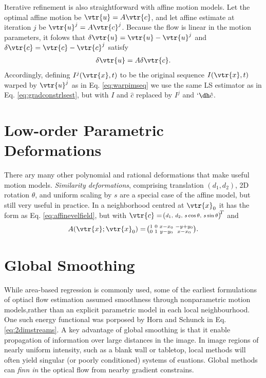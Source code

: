 \begin{compactdesc}
	Iterative refinement is also straightforward with affine motion models. Let the optimal affine motion be $\vtr{u}=A\vtr{c}$, and let affine estimate at iteration $j$ be $\vtr{u}^j=A\vtr{c}^{j}$. Because the flow is linear in the motion parameters, it folows that $\delta\vtr{u}=\vtr{u}-\vtr{u}^j$ and $\delta\vtr{c}=\vtr{c}-\vtr{c}^j$ satisfy
	\begin{gather*}
		\delta\vtr{u}=A\delta\vtr{c}.
	\end{gather*}
	Accordingly, defining $I^j(\vtr{x},t)$ to be the original sequence $I(\vtr{x},t)$ warped by $\vtr{u}^j$ as in Eq.  \ref{eq:warpimseq} we use the same LS estimator as in Eq. \ref{eq:gradconstrlsest}, but with $I$ and $\hat{c}$ replaced by $I^j$ and $`ð \hat{c}$.
	\section{Low-order Parametric Deformations}
	There ary many other polynomial and rational deformations that make useful motion models. \emph{Similarity deformations}, comprising translation $(d_1,d_2)$, 2D rotation $\theta$, and uniform scaling by $s$ are a special case of the affine model, but still very useful in practice. In a neighborhood centred at $\vtr{x}_0$ it has the form as Eq. \ref{eq:affinevelfield}, but with $\vtr{c}=
	{\!\left(\!\begin{smallmatrix}
		d_1,&d_2,&s\cos\theta,&s\sin\theta
	\end{smallmatrix}\!\right)\!}^T
	$ and
	\begin{gather*}
		A(\vtr{x};\vtr{x}_0)=
		\!\left(\!\begin{smallmatrix}
			1&0&x-x_0&-y+y_0\\
			0&1&y-y_0&x-x_0
		\end{smallmatrix}\!\right)\!.
	\end{gather*}
\section{Global Smoothing}
While area-based regression is commonly used, some of the earliest formulations of optiacl flow estimation assumed smoothness through nonparametric motion models,rather than an explicit parametric model in each local neighbourhood. One such energy functional was porposed by Horn and Schunck in Eq. \ref{eq:2dimstreams}. A key advantage of global smoothing is that it enable propagation of information over large distances in the image. In image regions of nearly uniform intensity, such as a blank wall or tabletop, local methods will often yield singular (or poorly conditioned) systems of euations. Global methods can \emph{finn in} the optical flow from nearby gradient constrains.


\end{compactdesc}

